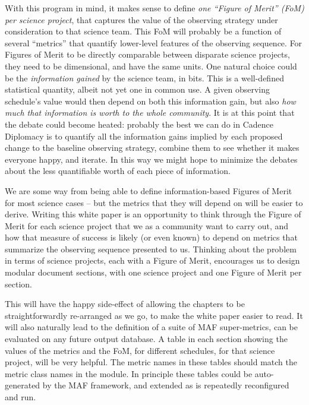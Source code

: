 With this program in mind, it makes sense to define {\it one ``Figure
of Merit'' (FoM) per science project}, that captures the value of  the
observing strategy under consideration to that science team. This FoM
will probably be a function of several ``metrics'' that quantify
lower-level features of the observing sequence.  For Figures of Merit
to be directly comparable between disparate science projects,  they
need to be dimensional, and have the same units. One natural
choice could be the {\it information gained} by the science team, in
bits. This is a well-defined statistical quantity, albeit not yet one
in common use. A given observing schedule's value would then depend on
both this information gain, but also {\it how much that information is
worth to the whole community}. It is at this point that the debate
could become heated: probably the best we can do in Cadence Diplomacy
is to quantify all the information gains implied by each proposed
change to the baseline  observing strategy, combine them to see
whether it makes everyone happy, and iterate. In this way we might
hope to minimize the debates about the less quantifiable worth of each
piece of information.

We are some way from being able to define information-based Figures of
Merit for most science cases -- but the metrics that they will depend
on will be easier to derive. Writing this white paper is an
opportunity to think through the Figure of Merit for each science
project that we as a community want to carry out, and how that measure
of success is likely (or even known) to depend on metrics that
summarize the observing sequence presented to us. Thinking about the
problem in terms of science projects, each with a  Figure of Merit,
encourages us to design modular document sections, with one science
project and one Figure of Merit per section.

This will have the happy side-effect of allowing the chapters to be
straightforwardly re-arranged as we go, to make the white paper easier
to read. It will also naturally lead to the definition of a suite of
MAF  super-metrics, can be evaluated on any future \OpSim output
database.  A table in each section showing the values of the metrics
and the FoM, for different schedules, for that science project, will
be very helpful. The metric names in these tables should match the
metric class names in the
\href{https://github.com/LSST-nonproject/sims_maf_contrib/wiki}{\simsMafContrib}
module. In principle these tables could be auto-generated by the MAF
framework, and extended as \OpSim is repeatedly reconfigured and run.

